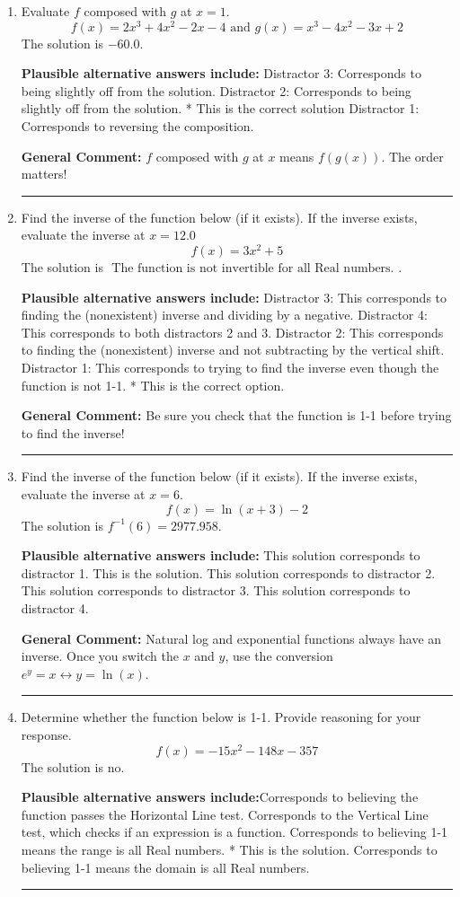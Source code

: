 \documentclass{extbook}[14pt]
\newcommand{\litem}[1]{\item #1

\rule{\textwidth}{0.4pt}}
\begin{document}
\begin{enumerate}\litem{
Evaluate $f$ composed with $g$ at $x=1$.
\[ f(x) = 2x^{3} +4 x^{2} -2 x -4 \text{ and } g(x) = x^{3} -4 x^{2} -3 x + 2 \]The solution is \( -60.0 \).\begin{enumerate}[label=\Alph*.]
\textbf{Plausible alternative answers include:} Distractor 3: Corresponds to being slightly off from the solution.
 Distractor 2: Corresponds to being slightly off from the solution.
* This is the correct solution
 Distractor 1: Corresponds to reversing the composition.

\end{enumerate}

\textbf{General Comment:} $f$ composed with $g$ at $x$ means $f(g(x))$. The order matters!
}
\litem{
Find the inverse of the function below (if it exists). If the inverse exists, evaluate the inverse at $x = 12.0$
\[ f(x) = 3 x^2 + 5 \]The solution is \( \text{ The function is not invertible for all Real numbers. } \).\begin{enumerate}[label=\Alph*.]
\textbf{Plausible alternative answers include:} Distractor 3: This corresponds to finding the (nonexistent) inverse and dividing by a negative.
 Distractor 4: This corresponds to both distractors 2 and 3.
 Distractor 2: This corresponds to finding the (nonexistent) inverse and not subtracting by the vertical shift.
 Distractor 1: This corresponds to trying to find the inverse even though the function is not 1-1. 
* This is the correct option.
\end{enumerate}

\textbf{General Comment:} Be sure you check that the function is 1-1 before trying to find the inverse!
}
\litem{
Find the inverse of the function below (if it exists). If the inverse exists, evaluate the inverse at $x = 6$.
\[ f(x) = \ln{(x+3)}-2 \]The solution is \( f^{-1}(6) = 2977.958 \).\begin{enumerate}[label=\Alph*.]
\textbf{Plausible alternative answers include:} This solution corresponds to distractor 1.
 This is the solution.
 This solution corresponds to distractor 2.
 This solution corresponds to distractor 3.
 This solution corresponds to distractor 4.
\end{enumerate}

\textbf{General Comment:} Natural log and exponential functions always have an inverse. Once you switch the $x$ and $y$, use the conversion $ e^y = x \leftrightarrow y=\ln(x)$.
}
\litem{
Determine whether the function below is 1-1. Provide reasoning for your response.
\[ f(x) = -15 x^2 - 148 x - 357 \]The solution is \( \text{no} \).\begin{enumerate}[label=\Alph*.]
\textbf{Plausible alternative answers include:}Corresponds to believing the function passes the Horizontal Line test.
Corresponds to the Vertical Line test, which checks if an expression is a function.
Corresponds to believing 1-1 means the range is all Real numbers.
* This is the solution.
Corresponds to believing 1-1 means the domain is all Real numbers.
\end{enumerate}

}
\end{enumerate}
\end{document}
